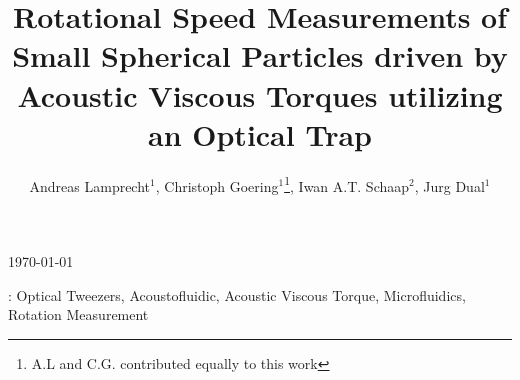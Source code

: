 \documentclass[12pt]{iopart}
\begin{document}
\title[Rotation Measurement of Particles with an Optial Tweezer]{Rotational 
Speed Measurements of Small Spherical Particles driven by Acoustic Viscous 
Torques utilizing an Optical Trap}

\author{Andreas Lamprecht$^1$, Christoph Goering$^1$\footnote{A.L and C.G.  
contributed equally to this work}, Iwan A.T. Schaap$^2$, Jurg Dual$^1$}

\address{$^1$ ETH Zurich, Institute for Mechanical Systems, Tannenstr 3, 8092 
Zurich, Switzerland}
\address{$^2$ SmarAct GmbH, Oldenburg, Germany}

\vspace{10pt}
\begin{indented}
    \item[] \today
\end{indented}

\begin{abstract}
    
\end{abstract}

\vspace{2pc}
: Optical Tweezers, Acoustofluidic, Acoustic Viscous 
Torque, Microfluidics, Rotation Measurement

\submitto{\JMM}




    
    
    
    
    


% 

 
\end{document}
